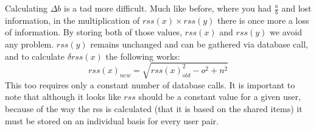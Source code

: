 \documentclass[12pt]{article}
\begin{document}
  \p Calculating $\Delta b$ is a tad more difficult.  Much like before, where you had $\frac{a}{b}$ and lost information, in the multiplication of $rss(x)\times rss(y)$ there is once more a loss of information.  By storing both of those values, $rss(x)$ and $rss(y)$ we avoid any problem.  $rss(y)$ remains unchanged and can be gathered via database call, and to calculate $\delta rss(x)$ the following works:
  \begin{displaymath}
    rss(x)_{new} = \sqrt{rss(x)_{old}^2 - o^2 + n^2}
  \end{displaymath}
  \p This too requires only a constant number of database calls.  It is important to note that although it looks like $rss$ should be a constant value for a given user, because of the way the rss is calculated (that it is based on the shared items) it must be stored on an individual basis for every user pair.
\end{document}
